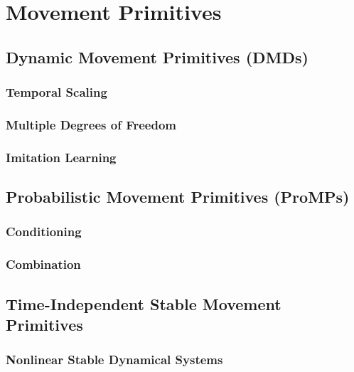 	\section{Movement Primitives} %

		\subsection{Dynamic Movement Primitives (DMDs)} %

			\subsubsection{Temporal Scaling} %

			\subsubsection{Multiple Degrees of Freedom} %

			\subsubsection{Imitation Learning} %

		\subsection{Probabilistic Movement Primitives (ProMPs)} %

			\subsubsection{Conditioning} %

			\subsubsection{Combination} %

		\subsection{Time-Independent Stable Movement Primitives} %

			\subsubsection{Nonlinear Stable Dynamical Systems} %

